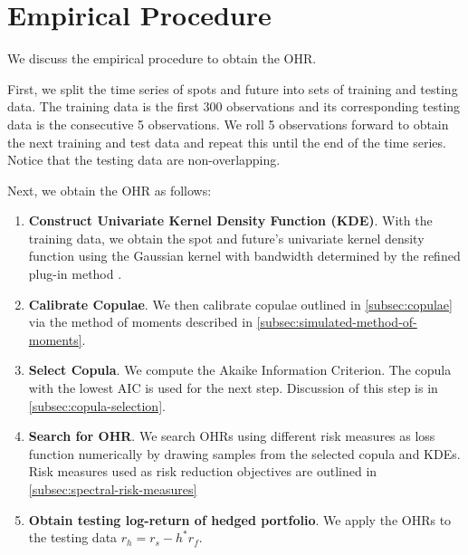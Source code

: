 \section{Empirical Procedure}\label{sec:empirical-procedure}
We discuss the empirical procedure to obtain the OHR.

First, we split the time series of spots and future into sets of training and testing data.
The training data is the first 300 observations and its corresponding testing data is the consecutive 5 observations.
We roll 5 observations forward to obtain the next training and test data and repeat this until the end of the time series.
Notice that the testing data are non-overlapping. \medskip

Next, we obtain the OHR as follows:

\begin{enumerate}
  \item \textbf{Construct Univariate Kernel Density Function (KDE)}.
  With the training data, we obtain the spot and future's univariate kernel density function using the Gaussian kernel
  with bandwidth determined by the refined plug-in method \citep[section 3.3.3]{hardle2004nonparametric}.
  \item \textbf{Calibrate Copulae}.
  We then calibrate copulae outlined in \ref{subsec:copulae} via the method of moments described in \ref{subsec:simulated-method-of-moments}.
  \item \textbf{Select Copula}.
  We compute the Akaike Information Criterion.
  The copula with the lowest AIC is used for the next step.
  Discussion of this step is in \ref{subsec:copula-selection}.
  \item \textbf{Search for OHR}.
  We search OHRs using different risk measures as loss function numerically by drawing samples from the selected copula and KDEs.
  Risk measures used as risk reduction objectives are outlined in \ref{subsec:spectral-risk-measures}
  \item \textbf{Obtain testing log-return of hedged portfolio}.
  We apply the OHRs to the testing data $r_h = r_s - h^* r_f$.
  \end{enumerate}






